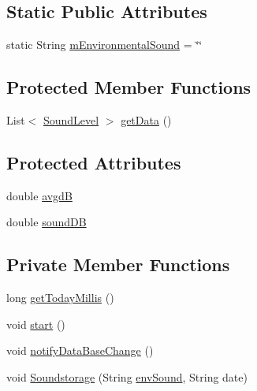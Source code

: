 \subsection*{Static Public Attributes}
\begin{DoxyCompactItemize}
\item 
static String \hyperlink{classcs_1_1usense_1_1microphone_1_1_microphone_pipeline_a179c8c39b7da546bad81cd44a0ccd7d3}{m\+Environmental\+Sound} = \char`\"{}\char`\"{}
\end{DoxyCompactItemize}
\subsection*{Protected Member Functions}
\begin{DoxyCompactItemize}
\item 
List$<$ \hyperlink{classcs_1_1usense_1_1microphone_1_1_sound_level}{Sound\+Level} $>$ \hyperlink{classcs_1_1usense_1_1microphone_1_1_microphone_pipeline_ab53dba4c63f5f2316cf789220a79fa4c}{get\+Data} ()
\end{DoxyCompactItemize}
\subsection*{Protected Attributes}
\begin{DoxyCompactItemize}
\item 
double \hyperlink{classcs_1_1usense_1_1microphone_1_1_microphone_pipeline_a3921f4576cf532cddf08ec884d71ca79}{avgd\+B}
\item 
double \hyperlink{classcs_1_1usense_1_1microphone_1_1_microphone_pipeline_afa11d6538443e5f38bee7f74af2e12a3}{sound\+D\+B}
\end{DoxyCompactItemize}
\subsection*{Private Member Functions}
\begin{DoxyCompactItemize}
\item 
long \hyperlink{classcs_1_1usense_1_1microphone_1_1_microphone_pipeline_aba07b5514f9375efae3c6b95d084d800}{get\+Today\+Millis} ()
\item 
void \hyperlink{classcs_1_1usense_1_1microphone_1_1_microphone_pipeline_a9349883fafe77564ca6c1b4ce743a61c}{start} ()
\item 
void \hyperlink{classcs_1_1usense_1_1microphone_1_1_microphone_pipeline_a997da3d33006d185fcab0a16ab7c664c}{notify\+Data\+Base\+Change} ()
\item 
void \hyperlink{classcs_1_1usense_1_1microphone_1_1_microphone_pipeline_a9ff083dc4b9bcbcd7376df6cbbd03cc2}{Soundstorage} (String \hyperlink{classcs_1_1usense_1_1microphone_1_1_microphone_pipeline_a9cf0bbbfbf30ee96be5d83c446f5396b}{env\+Sound}, String date)
\end{DoxyCompactItemize}

